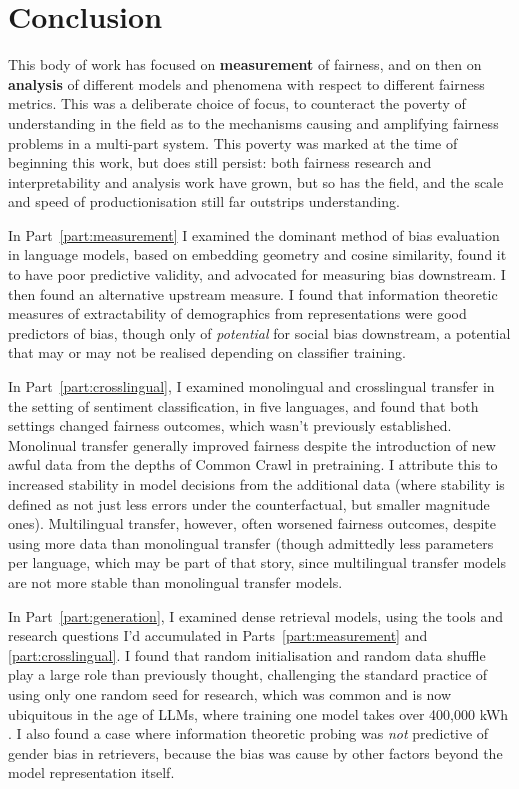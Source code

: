 \chapter{Conclusion}\label{chapter:conclusion}


This body of work has focused on \textbf{measurement} of fairness, and on then on \textbf{analysis} of different models and phenomena with respect to different fairness metrics. This was a deliberate choice of focus, to counteract the poverty of understanding in the field as to the mechanisms causing and amplifying fairness problems in a multi-part system. This poverty was marked at the time of beginning this work, but does still persist: both fairness research and interpretability and analysis work have grown, but so has the field, and the scale and speed of productionisation still far outstrips understanding. 

In Part~\ref{part:measurement} I examined the dominant method of bias evaluation in language models, based on embedding geometry and cosine similarity, found it to have poor predictive validity, and advocated for measuring bias downstream. 
I then found an alternative upstream measure. I found that information theoretic measures of extractability of demographics from representations were good predictors of bias, though only of \textit{potential} for social bias downstream, a potential that may or may not be realised depending on classifier training. 

In Part~\ref{part:crosslingual}, I examined monolingual and crosslingual transfer in the setting of sentiment classification, in five languages, and found that both settings changed fairness outcomes, which wasn't previously established. Monolinual transfer generally improved fairness despite the introduction of new awful data from the depths of Common Crawl in pretraining. I attribute this to increased stability in model decisions from the additional data (where stability is defined as not just less errors under the counterfactual, but smaller magnitude ones). Multilingual transfer, however, often worsened fairness outcomes, despite using more data than monolingual transfer (though admittedly less parameters per language, which may be part of that story, since multilingual transfer models are not more stable than monolingual transfer models.

In Part~\ref{part:generation}, I examined dense retrieval models, using the tools and research questions I'd accumulated in Parts~\ref{part:measurement} and \ref{part:crosslingual}. I found that random initialisation and random data shuffle play a large role than previously thought, challenging the standard practice of using only one random seed for research, which was common and is now ubiquitous in the age of LLMs, where training one model takes over 400,000 kWh \citep{luccioni_bloom_carbon}. I also found a case where information theoretic probing was \textit{not} predictive of gender bias in retrievers, because the bias was cause by other factors beyond the model representation itself. 


